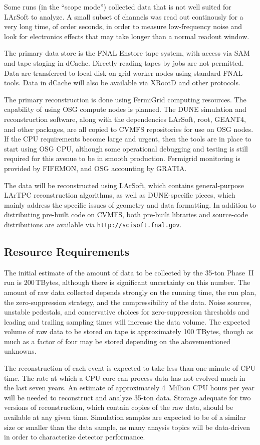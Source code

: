Some runs (in the ``scope mode'') collected data that is not well suited for LArSoft to analyze.  A small subset
of channels was read out continously for a very long time, of order seconds, in order to measure
low-frequency noise and look for electronics effects that may take longer than a normal readout window.

The primary data store is the  FNAL Enstore tape system, with access via SAM and tape staging in
dCache.  Directly reading tapes by jobs are not permitted.  Data are transferred to local disk on grid
worker nodes using standard FNAL tools.  Data in dCache will also be available via XRootD and other protocols.

The primary reconstruction is done using FermiGrid computing resources.  The capability
of using OSG compute nodes is planned.  The DUNE simulation and reconstruction software, along with the
dependencies LArSoft, root, GEANT4, and other packages, are all copied to CVMFS repositories for use on
OSG nodes.  If the CPU requirements become large and urgent, then the tools are in place to start using
OSG CPU, although some operational debugging and testing is still required for this avenue to be in smooth
production.  Fermigrid monitoring is provided by FIFEMON, and OSG accounting by GRATIA.

The data will be reconstructed using LArSoft, which contains general-purpose LArTPC reconstruction algorithms,
as well as DUNE-specific pieces, which mainly address the specific issues of geometry and data formatting.
In addition to distributing pre-built code on CVMFS, both pre-built libraries and source-code distributions
are available via {\tt http://scisoft.fnal.gov}.


\subsection{Resource Requirements}
\label{sec:35t-resource-requirements}
The initial estimate of the amount of data to be collected by the 35-ton Phase~II run is 200\,TBytes,
although there is significant uncertainty on this number.  The amount of raw data collected
depends strongly on the running time, the run plan, the zero-suppression strategy, and the
compressibility of the data.  Noise sources, unstable pedestals, and conservative choices for zero-suppression
thresholds and leading and trailing sampling times will increase the data volume.
The expected volume of raw data to be stored on tape is approximately 100 TBytes, though as much as a factor
of four may be stored depending on the abovementioned unknowns.

The reconstruction of each event is expected to take less than one minute of CPU time.  The rate at which
a CPU core can process data has not evolved much in the last seven years.  An estimate of approximately
4~Million CPU hours per year will be needed to reconstruct and analyze 35-ton data.  Storage adequate for
two versions of reconstruction, which contain copies of the raw data, should be available at any given time.
Simulation samples are expected to be of a similar size or smaller than the data sample, as many anaysis
topics will be data-driven in order to characterize detector performance.
